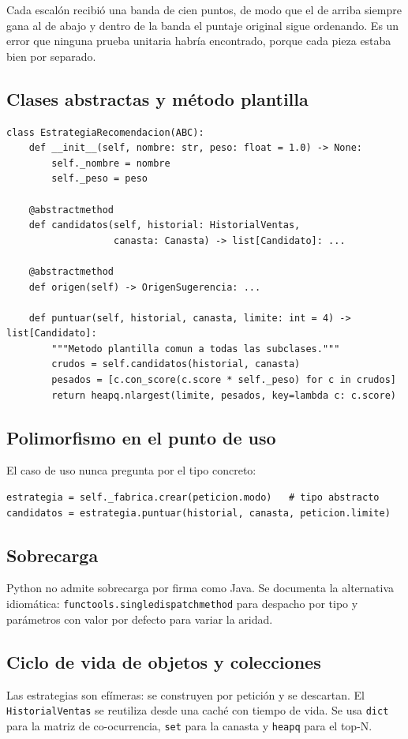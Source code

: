 \documentclass[11pt,letterpaper]{article}
\begin{document}
Cada escalón recibió una banda de cien puntos, de modo que el de arriba siempre
gana al de abajo y dentro de la banda el puntaje original sigue ordenando. Es un
error que ninguna prueba unitaria habría encontrado, porque cada pieza estaba
bien por separado.

\subsection{Clases abstractas y método plantilla}
\begin{lstlisting}[caption={Clase abstracta con metodo plantilla.}]
class EstrategiaRecomendacion(ABC):
    def __init__(self, nombre: str, peso: float = 1.0) -> None:
        self._nombre = nombre
        self._peso = peso

    @abstractmethod
    def candidatos(self, historial: HistorialVentas,
                   canasta: Canasta) -> list[Candidato]: ...

    @abstractmethod
    def origen(self) -> OrigenSugerencia: ...

    def puntuar(self, historial, canasta, limite: int = 4) -> list[Candidato]:
        """Metodo plantilla comun a todas las subclases."""
        crudos = self.candidatos(historial, canasta)
        pesados = [c.con_score(c.score * self._peso) for c in crudos]
        return heapq.nlargest(limite, pesados, key=lambda c: c.score)
\end{lstlisting}

\subsection{Polimorfismo en el punto de uso}
El caso de uso nunca pregunta por el tipo concreto:

\begin{lstlisting}
estrategia = self._fabrica.crear(peticion.modo)   # tipo abstracto
candidatos = estrategia.puntuar(historial, canasta, peticion.limite)
\end{lstlisting}

\subsection{Sobrecarga}
Python no admite sobrecarga por firma como Java. Se documenta la alternativa
idiomática: \texttt{functools.singledispatchmethod} para despacho por tipo y
parámetros con valor por defecto para variar la aridad.

\subsection{Ciclo de vida de objetos y colecciones}
Las estrategias son efímeras: se construyen por petición y se descartan. El
\texttt{HistorialVentas} se reutiliza desde una caché con tiempo de vida. Se usa
\texttt{dict} para la matriz de co-ocurrencia, \texttt{set} para la canasta y
\texttt{heapq} para el top-N.
\end{document}
